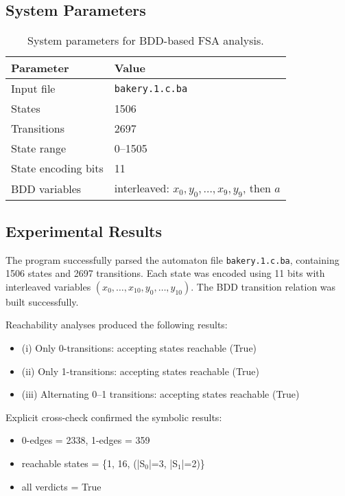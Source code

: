 \documentclass[a4paper,11pt]{article}
\begin{document}
\subsection*{System Parameters}

\begin{table}[h]
\centering
\begin{tabular}{l|l}
\textbf{Parameter} & \textbf{Value} \\\hline
Input file & \texttt{bakery.1.c.ba} \\
States & 1506 \\
Transitions & 2697 \\
State range & 0--1505 \\
State encoding bits & 11 \\
BDD variables & interleaved: $x_0,y_0,\dots,x_9,y_9$, then $a$ \\
\end{tabular}
\caption{System parameters for BDD-based FSA analysis.}
\end{table}



\subsection*{Experimental Results}

The program successfully parsed the automaton file \texttt{bakery.1.c.ba},
containing 1506 states and 2697 transitions.
Each state was encoded using 11 bits with interleaved variables
\((x_0,\dots,x_{10},y_0,\dots,y_{10})\).
The BDD transition relation was built successfully.

Reachability analyses produced the following results:

\begin{itemize}
  \item (i) Only 0-transitions: accepting states reachable (True)
  \item (ii) Only 1-transitions: accepting states reachable (True)
  \item (iii) Alternating 0–1 transitions: accepting states reachable (True)
\end{itemize}

Explicit cross-check confirmed the symbolic results:
\begin{itemize}
  \item 0-edges = 2338, 1-edges = 359
  \item reachable states = \{1, 16, (|S$_0$|=3, |S$_1$|=2)\}
  \item all verdicts = True
\end{itemize}
\end{document}
